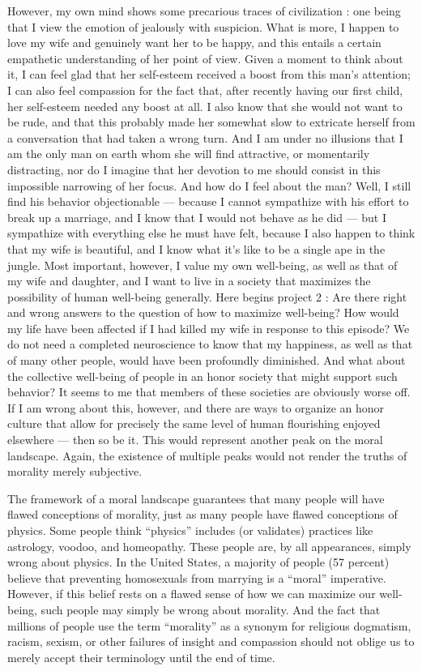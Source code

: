 \documentclass[a4paper,14pt]{extbook}
\begin{document}
However, my own mind shows some precarious traces of civilization :
one being that I view the emotion of jealously with suspicion.
What is more, I happen to love my wife and genuinely want her to be happy, and this entails a certain empathetic understanding of her point of view.
Given a moment to think about it, I can feel glad that her self-esteem received a boost from this man's attention;
I can also feel compassion for the fact that, after recently having our first child, her self-esteem needed any boost at all.
I also know that she would not want to be rude, and that this probably made her somewhat slow to extricate herself from a conversation that had taken a wrong turn.
And I am under no illusions that I am the only man on earth whom she will find attractive, or momentarily distracting, nor do I imagine that her devotion to me should consist in this impossible narrowing of her focus.
And how do I feel about the man?
Well, I still find his behavior objectionable --- because I cannot sympathize with his effort to break up a marriage, and I know that I would not behave as he did --- but I sympathize with everything else he must have felt, because I also happen to think that my wife is beautiful, and I know what it's like to be a single ape in the jungle.
Most important, however, I value my own well-being, as well as that of my wife and daughter, and I want to live in a society that maximizes the possibility of human well-being generally.
Here begins project 2 :
Are there right and wrong answers to the question of how to maximize well-being?
How would my life have been affected if I had killed my wife in response to this episode?
We do not need a completed neuroscience to know that my happiness, as well as that of many other people, would have been profoundly diminished.
And what about the collective well-being of people in an honor society that might support such behavior?
It seems to me that members of these societies are obviously worse off.
If I am wrong about this, however, and there are ways to organize an honor culture that allow for precisely the same level of human flourishing enjoyed elsewhere --- then so be it.
This would represent another peak on the moral landscape.
Again, the existence of multiple peaks would not render the truths of morality merely subjective.

The framework of a moral landscape guarantees that many people will have flawed conceptions of morality, just as many people have flawed conceptions of physics.
Some people think ``physics'' includes (or validates) practices like astrology, voodoo, and homeopathy.
These people are, by all appearances, simply wrong about physics.
In the United States, a majority of people (57 percent) believe that preventing homosexuals from marrying is a ``moral'' imperative.
However, if this belief rests on a flawed sense of how we can maximize our well-being, such people may simply be wrong about morality.
And the fact that millions of people use the term ``morality'' as a synonym for religious dogmatism, racism, sexism, or other failures of insight and compassion should not oblige us to merely accept their terminology until the end of time.
\end{document}
